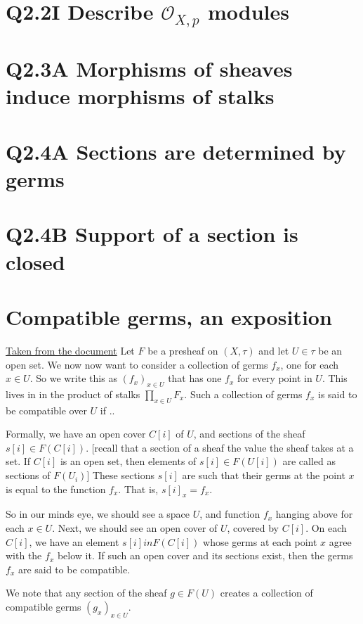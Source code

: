 \documentclass{book}
\renewcommand{\O}{\ensuremath{\mathcal{O}}}
\theoremstyle{definition}
\begin{document}
\section{Q2.2I Describe $\O_{X, p}$ modules}
\section{Q2.3A Morphisms of sheaves induce morphisms of stalks}
\section{Q2.4A Sections are determined by germs}
\section{Q2.4B Support of a section is closed}
                                                                                                             
\section{Compatible germs, an exposition}
\href{https://math.mit.edu/~phaine/files/Sheaf_Theory_Exercises.pdf}{Taken from the document}
Let $F$ be a presheaf on $(X, \tau)$ and let $U \in \tau$ be an open set. We now
now want to consider a collection of germs $f_x$, one for each $x \in U$.
So we write this as $(f_x)_{x \in U}$ that has one $f_x$ for every point in $U$. 
This lives in in the product of stalks $\prod_{x \in U} F_x$. Such a collection
of germs $f_x$ is said to be compatible over $U$ if ..

Formally, we have an open cover $C[i]$ of $U$, and sections of the sheaf $s[i] \in F(C[i])$.
[recall that a section of a sheaf the value the sheaf takes at a set. If $C[i]$
is an open set, then elements of $s[i] \in F(U[i])$ are called as sections of $F(U_i)$]
These sections $s[i]$ are such that their germs at the point $x$ is equal
to the function $f_x$. That is, $s[i]_x = f_x$.

So in our minds eye, we should see a space $U$, and function $f_x$ hanging
above for each $x \in U$. Next, we should see an open cover of $U$, covered by $C[i]$.
On each $C[i]$, we have an element $s[i] in F(C[i])$ whose germs at each point $x$ agree
with the $f_x$ below it. If such an open cover and its sections exist, then the
germs $f_x$ are said to be compatible. 

We note that any section of the sheaf $g \in F(U)$ creates a collection of compatible germs $(g_x)_{x \in U}$.
\end{document}
